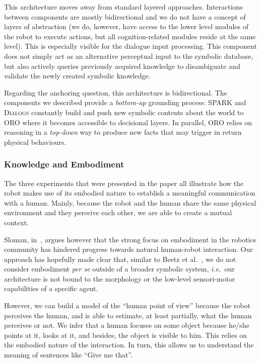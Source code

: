 \documentclass{svmult}
\newcommand{\ie}{{\textit{i.e.~}}}
\begin{document}
This architecture moves away from standard layered approaches. Interactions
between components are mostly bidirectional and we do not have a concept of
layers of abstraction (we do, however, have access to the lower level modules
of the robot to execute actions, but all cognition-related modules reside at the
same level). This is especially visible for the dialogue input processing. This
component does not simply act as an alternative perceptual input to the
symbolic database, but also actively queries previously acquired knowledge to
disambiguate and validate the newly created symbolic knowledge.


Regarding the anchoring question, this architecture is
bidirectional. The components we described provide a \textit{bottom-up}
grounding process: SPARK and \textsc{Dialogs} constantly build and push new
symbolic contents about the world to ORO where it becomes accessible to
decisional layers. In parallel, ORO relies on reasoning in a \textit{top-down}
way to produce new facts that may trigger in return physical behaviours. 

\subsubsection{Knowledge and Embodiment}

The three experiments that were presented in the paper all illustrate how the
robot makes use of its embodied nature to establish a meaningful communication
with a human. Mainly, because the robot and the human share the same physical
environment and they perceive each other, we are able to create a mutual
context.

Sloman, in~\cite{Sloman2009}, argues however that the strong focus on
embodiment in the robotics community has hindered progress towards natural
human-robot interaction. Our approach has hopefully made clear that, similar to
Beetz et al.~\cite{Beetz2010}, we do not consider embodiment \emph{per se} outside of
a broader symbolic system, \ie our architecture is not bound to the morphology or
the low-level sensori-motor capabilities of a specific agent. 

However, we can build a model of the ``human point of view'' because the robot
perceives the human, and is able to estimate, at least partially, what the
human perceives or not. We infer that a human focuses on some object because
he/she points at it, looks at it, and besides, the object is visible to him.
This relies on the embodied nature of the interaction. In turn, this allows us
to understand the meaning of sentences like ``Give me that''.
\end{document}
